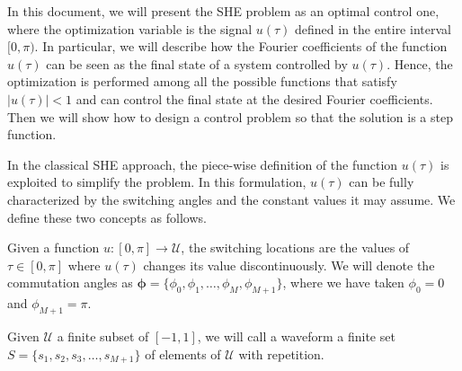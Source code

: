 In this document, we will present the SHE problem as an optimal control one, where the optimization variable is the signal $u(\tau)$ defined in the entire interval $[0,\pi)$. 
%
In particular, we will describe how the Fourier coefficients of the function $u(\tau)$ can be seen as the final state of a system controlled by $u (\tau)$. Hence, the optimization is performed among all the possible functions that satisfy $|u(\tau)|<1 $ and can control the final state at the desired Fourier coefficients. Then we will show how to design a control problem so that the solution is a step function.

In the classical SHE approach, the piece-wise definition of the function $u(\tau)$ is exploited to simplify the problem. In this formulation, $u(\tau)$ can be fully characterized by the switching angles and the constant values it may assume. We define these two concepts as follows.
\newline

\begin{definition}
Given a function $u:[0,\pi] \rightarrow \mathcal{U}$, the switching locations are the values of $\tau\in[0,\pi]$ where $u(\tau)$ changes its value discontinuously. We will denote the commutation angles as $\bm{\phi} = \{\phi_0,\phi_1,\dots,\phi_M,\phi_{M+1}\}$, where we have taken $\phi_0 = 0$ and $\phi_{M+1} = \pi$.
\end{definition}

\begin{definition}\label{def:waveform}
Given $\mathcal U$ a finite subset of $[-1,1]$, we will call a waveform a finite set $S = \{s_1,s_2,s_3,\dots,s_{M+1}\}$ of elements of $\mathcal {U}$ with repetition.
\end{definition}

